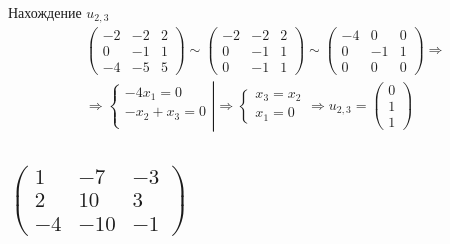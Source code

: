 \documentclass[12pt]{article}
\begin{document}
\begin{sloppypar}
    Нахождение $u_{2,3}$
    \begin{align*}
         & \begin{pmatrix}
               -2 & -2 & 2 \\
               0  & -1 & 1 \\
               -4 & -5 & 5
           \end{pmatrix}
        \sim
        \begin{pmatrix}
            -2 & -2 & 2 \\
            0  & -1 & 1 \\
            0  & -1 & 1
        \end{pmatrix}
        \sim
        \begin{pmatrix}
            -4 & 0  & 0 \\
            0  & -1 & 1 \\
            0  & 0  & 0
        \end{pmatrix}
        \Rightarrow       \\
         & \Rightarrow
        \left.\begin{cases}
                  -4x_1 = 0      \\
                  -x_2 + x_3 = 0 \\
              \end{cases}\right|
        \Rightarrow
        \begin{cases}
            x_3 = x_2 \\
            x_1 = 0
        \end{cases}
        \Rightarrow
        u_{2,3} = \begin{pmatrix}
                      0 \\ 1 \\ 1
                  \end{pmatrix}
    \end{align*}


    \subsection{$\begin{pmatrix}
                1  & -7  & -3 \\
                2  & 10  & 3  \\
                -4 & -10 & -1
            \end{pmatrix}$}


\end{sloppypar}
\end{document}
